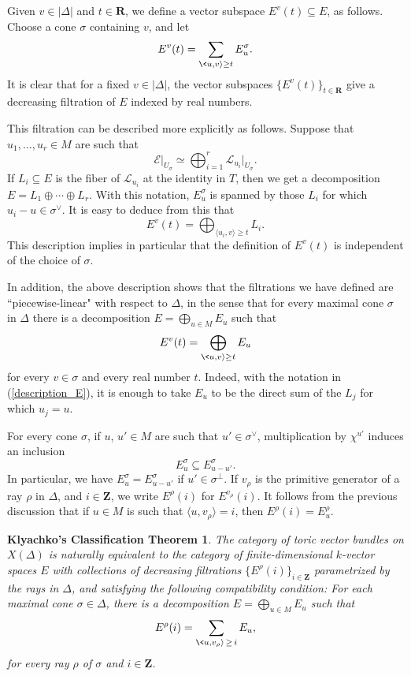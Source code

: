 \documentclass[12pt]{amsart}
\newtheorem*{KCT}{Klyachko's Classification Theorem}
\theoremstyle{definition}
\theoremstyle{remark}
\begin{document}
Given $v\in |\Delta|$ and $t\in {{\mathbf R}}$, we define a vector subspace
$E^v(t)\subseteq E$, as follows. Choose a cone $\sigma$ containing
$v$, and let
\[ E^v(t) = \sum_{\<u,v{\rangle} \geq t} E^\sigma_u.
\]
It is clear that for a fixed $v\in |\Delta|$, the vector subspaces
$\{E^v(t)\}_{t\in{{\mathbf R}}}$ give a decreasing filtration of $E$ indexed
by real numbers.

This filtration can be described more explicitly as follows. Suppose
that $u_1,\ldots,u_r\in M$ are such that
$${\mathcal{E}}\vert_{U_{\sigma}}\simeq\bigoplus_{i=1}^r{\mathcal{L}}_{u_i}\vert_{U_{\sigma}}.$$
If $L_i\subseteq E$ is the fiber of ${\mathcal{L}}_{u_i}$ at the identity in
$T$, then we get a decomposition $E=L_1\oplus\cdots\oplus L_r$. With
this notation, $E^{\sigma}_u$ is spanned by those $L_i$ for which
$u_i-u\in \sigma^{\vee}$. It is easy to deduce from this that
\begin{equation}\label{description_E}
E^v(t)=\bigoplus_{\langle u_i,v\rangle\geq t}L_i.
\end{equation}
This description implies in particular that the definition of
$E^v(t)$ is independent of the choice of $\sigma$.

In addition, the above description shows that the filtrations we
have defined are ``piecewise-linear" with
 respect to $\Delta$, in the sense that for every maximal cone $\sigma$ in $\Delta$ there is a decomposition $E = \bigoplus_{u \in M} E_u$ such that
\[
E^v(t) = \bigoplus_{\<u, v{\rangle} \geq t} E_u
\]
for every $v \in \sigma$ and every real number $t$. Indeed, with the
notation in (\ref{description_E}), it is enough to take $E_u$ to be
the direct sum of the $L_j$ for which $u_j=u$.

\medskip

For every cone $\sigma$, if $u$, $u'\in M$ are such that
$u'\in\sigma^{\vee}$, multiplication by $\chi^{u'}$ induces an
inclusion
$$E^{\sigma}_u\subseteq E^{\sigma}_{u-u'}.$$
In particular, we have $E^{\sigma}_u=E^{\sigma}_{u-u'}$ if
$u'\in\sigma^{\perp}$. If $v_{\rho}$ is the primitive generator of a
ray $\rho$ in $\Delta$, and $i\in{{\mathbf Z}}$, we write $E^{\rho}(i)$ for
$E^{v_{\rho}}(i)$. It follows from the previous discussion that if
$u\in M$ is such that $\langle u,v_{\rho}\rangle =i$, then
$E^{\rho}(i)=E^{\rho}_u$.

\begin{KCT}
The category of toric vector bundles on $X(\Delta)$ is naturally
equivalent to the category of finite-dimensional $k$-vector spaces
$E$ with collections of decreasing filtrations
$\{E^\rho(i)\}_{i\in{{\mathbf Z}}}$ parametrized by the rays in $\Delta$, and
satisfying the following compatibility condition: For each maximal
cone $\sigma \in \Delta$, there is a decomposition $E = \bigoplus_{u
\in M} E_{u}$ such that
\[
E^\rho(i) = \sum_{\<u, v_\rho{\rangle} \, \geq \, i} E_{u},
\]
 for every ray $\rho$ of $\sigma$ and $i \in {{\mathbf Z}}$.
\end{KCT}
\end{document}
